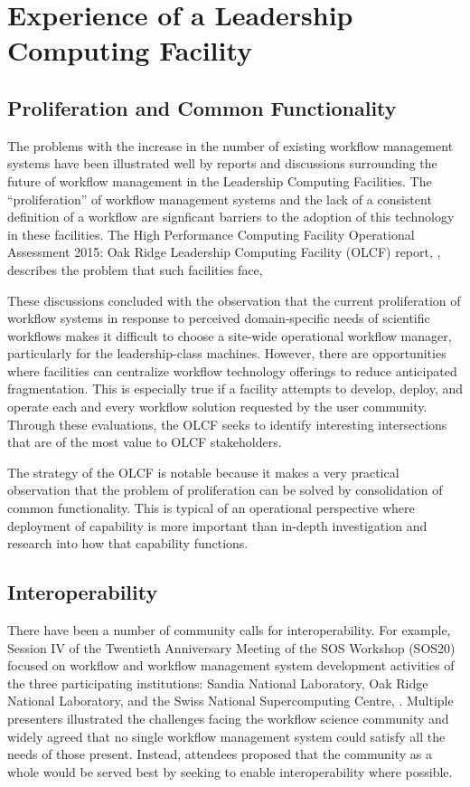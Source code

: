 \section{Experience of a Leadership Computing Facility}

\subsection{Proliferation and Common Functionality} \label{commonFunc}

The problems with the increase in the number of existing workflow management
systems have been illustrated well by reports and discussions surrounding the
future of workflow management in the Leadership Computing Facilities. The
``proliferation'' of workflow management systems and the lack of a consistent
definition of a workflow are signficant barriers to the adoption of this
technology in these facilities. The High Performance Computing Facility
Operational Assessment 2015: Oak Ridge Leadership Computing Facility (OLCF)
report, \cite{barker_scientific_2007}, describes the problem that such
facilities face,  \begin{displayquote} These discussions concluded with the
observation that the current proliferation of workflow systems in response to
perceived domain-specific needs of scientific workflows makes it difficult to
choose a site-wide operational workflow manager, particularly for the
leadership-class machines. However, there are opportunities where facilities
can centralize workflow technology offerings to reduce anticipated
fragmentation. This is especially true if a facility attempts to develop,
deploy, and operate each and every workflow solution requested by the user
community. Through these evaluations, the OLCF seeks to identify interesting
intersections that are of the most value to OLCF stakeholders.
\end{displayquote}  The strategy of the OLCF is notable because it makes a
very practical observation that the problem of proliferation can be solved by
consolidation of common functionality. This is typical of an operational
perspective where deployment of capability is more important than in-depth
investigation and research into how that capability functions.

\subsection{Interoperability}

There have been a number of community calls for interoperability. For example,
Session IV of the Twentieth Anniversary Meeting of the SOS Workshop (SOS20)
focused on workflow and workflow management system development activities of
the three participating institutions: Sandia National Laboratory, Oak Ridge
National Laboratory, and the Swiss National Supercomputing Centre,
\cite{pack_sos20_2016}. Multiple presenters illustrated the challenges facing
the workflow science community and widely agreed that no single workflow
management system could satisfy all the needs of those present. Instead,
attendees proposed that the community as a whole would be served best by
seeking to enable interoperability where possible.

